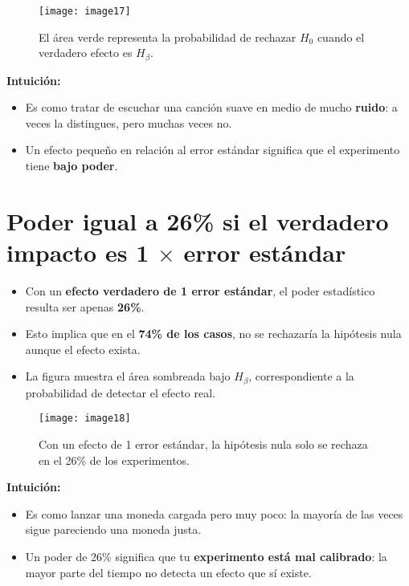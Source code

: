 \documentclass[12pt]{article}
\begin{document}
\begin{figure}[H]
    \centering
    \texttt{[image: image17]}
    \caption{\footnotesize El área verde representa la probabilidad de rechazar $H_0$ cuando el verdadero efecto es $H_\beta$.}
\end{figure}

\textbf{Intuición:}
\begin{itemize}
    \item Es como tratar de escuchar una canción suave en medio de mucho \textbf{ruido}: a veces la distingues, pero muchas veces no.
    \item Un efecto pequeño en relación al error estándar significa que el experimento tiene \textbf{bajo poder}.
\end{itemize}

\section*{\noindent\textbf{Poder igual a 26\% si el verdadero impacto es 1 $\times$ error estándar}}

\begin{itemize}
    \item Con un \textbf{efecto verdadero de 1 error estándar}, el poder estadístico resulta ser apenas \textbf{26\%}.
    \item Esto implica que en el \textbf{74\% de los casos}, no se rechazaría la hipótesis nula aunque el efecto exista.
    \item La figura muestra el área sombreada bajo $H_\beta$, correspondiente a la probabilidad de detectar el efecto real.
\end{itemize}

\begin{figure}[H]
    \centering
    \texttt{[image: image18]}
    \caption{\footnotesize Con un efecto de 1 error estándar, la hipótesis nula solo se rechaza en el 26\% de los experimentos.}
\end{figure}

\textbf{Intuición:}
\begin{itemize}
    \item Es como lanzar una moneda cargada pero muy poco: la mayoría de las veces sigue pareciendo una moneda justa.
    \item Un poder de 26\% significa que tu \textbf{experimento está mal calibrado}: la mayor parte del tiempo no detecta un efecto que sí existe.
\end{itemize}
\end{document}
